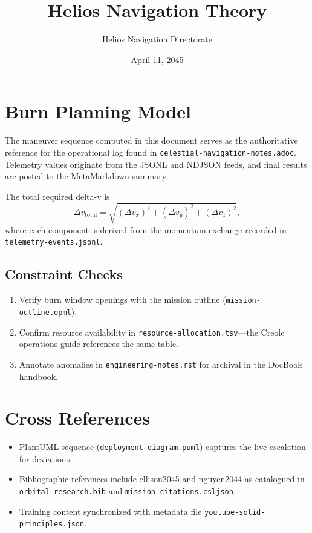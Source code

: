 \title{Helios Navigation Theory}
\author{Helios Navigation Directorate}
\date{April 11, 2045}

\section{Burn Planning Model}
The maneuver sequence computed in this document serves as the authoritative reference for the operational log found in \texttt{celestial-navigation-notes.adoc}. Telemetry values originate from the JSONL and NDJSON feeds, and final results are posted to the MetaMarkdown summary.

The total required delta-v is
\[
  \Delta v_\text{total} = \sqrt{(\Delta v_x)^2 + (\Delta v_y)^2 + (\Delta v_z)^2},
\]
where each component is derived from the momentum exchange recorded in \texttt{telemetry-events.jsonl}.

\subsection{Constraint Checks}
\begin{enumerate}
  \item Verify burn window openings with the mission outline (\texttt{mission-outline.opml}).
  \item Confirm resource availability in \texttt{resource-allocation.tsv}---the Creole operations guide references the same table.
  \item Annotate anomalies in \texttt{engineering-notes.rst} for archival in the DocBook handbook.
\end{enumerate}

\section{Cross References}
\begin{itemize}
  \item PlantUML sequence (\texttt{deployment-diagram.puml}) captures the live escalation for deviations.
  \item Bibliographic references include ellison2045 and nguyen2044 as catalogued in \texttt{orbital-research.bib} and \texttt{mission-citations.csljson}.
  \item Training content synchronized with metadata file \texttt{youtube-solid-principles.json}.
\end{itemize}
